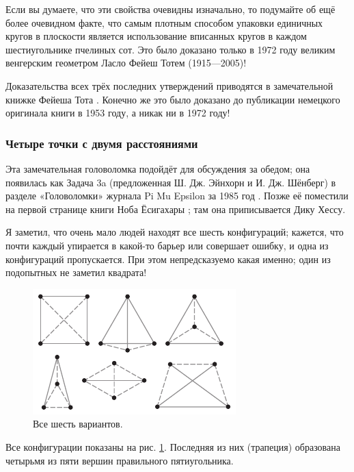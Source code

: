 Если вы думаете, что эти свойства очевидны изначально, то подумайте об ещё более очевидном факте, что самым плотным способом упаковки единичных кругов в плоскости является использование вписанных кругов в каждом шестиугольнике пчелиных сот.
Это было доказано только в 1972 году великим венгерским геометром Ласло Фейеш Тотем (1915---2005)!

\begin{addedbytheeditors}
Доказательства всех трёх последних утверждений приводятся в замечательной книжке Фейеша Тота \cite[III §3]{tot}.
Конечно же это было доказано до публикации немецкого оригинала книги в 1953 году, а никак ни в 1972 году!
\end{addedbytheeditors}

\subsubsection*{Четыре точки с двумя расстояниями}

Эта замечательная головоломка подойдёт для обсуждения за обедом;
она появилась как Задача 3a (предложенная Ш. Дж. Эйнхорн и И. Дж. Шёнберг) в разделе «Головоломки» журнала Pi Mu Epsilon за 1985 год \cite{einhorn-schoenberg}.
Позже её поместили на первой странице книги Ноба Ёсигахары \cite{yoshigahara};
там она приписывается Дику Хессу.

Я заметил, что очень мало людей находят все шесть конфигураций;
кажется, что почти каждый упирается в какой-то барьер или совершает ошибку, и одна из конфигураций пропускается.
При этом непредсказуемо какая именно; один из подопытных не заметил квадрата!

\begin{figure}[h!]
\centering
\includegraphics[scale=1]{pics/2dist}
\caption{Все шесть вариантов.}
\label{pic:2dist}
\end{figure}

Все конфигурации показаны на рис. \ref{pic:2dist}.
Последняя из них (трапеция) образована четырьмя из пяти вершин правильного пятиугольника.


